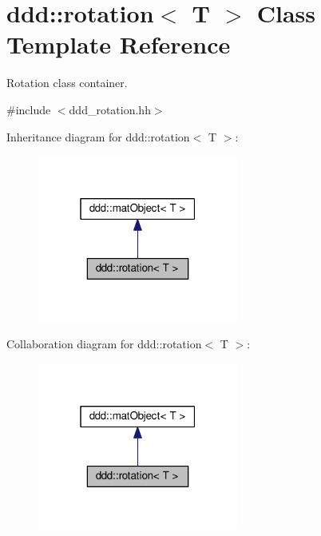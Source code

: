 \hypertarget{classddd_1_1rotation}{}\section{ddd\+:\+:rotation$<$ T $>$ Class Template Reference}
\label{classddd_1_1rotation}


Rotation class container.  




{\ttfamily \#include $<$ddd\+\_\+rotation.\+hh$>$}



Inheritance diagram for ddd\+:\+:rotation$<$ T $>$\+:
\nopagebreak
\begin{figure}[H]
\begin{center}
\leavevmode
\includegraphics[width=187pt]{d2/d78/classddd_1_1rotation__inherit__graph}
\end{center}
\end{figure}


Collaboration diagram for ddd\+:\+:rotation$<$ T $>$\+:
\nopagebreak
\begin{figure}[H]
\begin{center}
\leavevmode
\includegraphics[width=187pt]{d7/df5/classddd_1_1rotation__coll__graph}
\end{center}
\end{figure}
